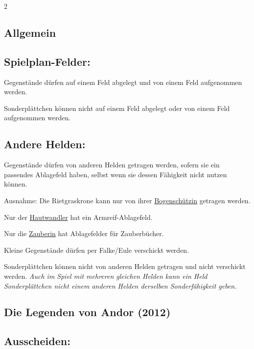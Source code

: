 \documentclass[10pt, a4paper, oneside]{book}
\newcommand{\fan}[1]{\textit{#1}}
\begin{document}
\begin{multicols*}{2}
\begin{nobgcolor}
\section{Allgemein}


\subsection{Spielplan-Felder:}
Gegenstände dürfen auf einem Feld abgelegt und von einem Feld aufgenommen werden.

Sonderplättchen können nicht auf einem Feld abgelegt oder von einem Feld aufgenommen werden.
\supercite{117803}

\subsection{Andere Helden:}
Gegenstände dürfen von anderen Helden getragen werden, sofern sie ein passendes Ablagefeld haben, selbst wenn sie dessen Fähigkeit nicht nutzen können.

Ausnahme: Die Rietgraskrone kann nur von ihrer \hyperref[bogenschuetzin]{Bogenschützin} getragen werden.

Nur der \hyperref[hautwandler]{Hautwandler} hat ein Armreif-Ablagefeld.

Nur die \hyperref[zauberin]{Zauberin} hat Ablagefelder für Zauberbücher.

Kleine Gegenstände dürfen per Falke/Eule verschickt werden.

Sonderplättchen können nicht von anderen Helden getragen und nicht verschickt werden. \fan{Auch im Spiel mit mehreren gleichen Helden kann ein Held Sonderplättchen nicht einem anderen Helden derselben Sonderfähigkeit geben.}

\end{nobgcolor}



\columnbreak


\begin{bgcolor}
\section{Die Legenden von Andor (2012)}



\subsection{Ausscheiden:}


\end{bgcolor}
\end{multicols*}
\end{document}
